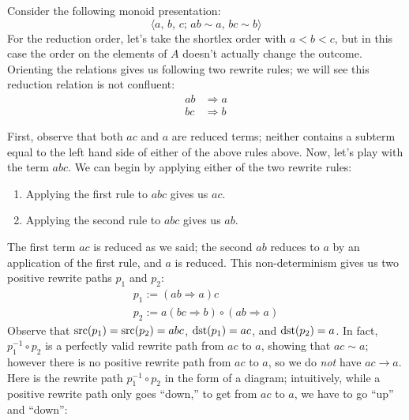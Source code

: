 \documentclass[../generics]{subfiles}
\begin{document}
\begin{example}\label{not confluent presentation}
Consider the following monoid presentation:
\[\langle a,\,b,\,c;\,ab\sim a,\,bc\sim b\rangle\]
For the reduction order, let's take the shortlex order with $a<b<c$, but in this case the order on the elements of $A$ doesn't actually change the outcome. Orienting the relations gives us following two rewrite rules; we will see this reduction relation is not confluent:
\begin{align*}
ab&\Rightarrow a\\
bc&\Rightarrow b
\end{align*}

%
First, observe that both $ac$ and $a$ are reduced terms; neither contains a subterm equal to the left hand side of either of the above rules above. Now, let's play with the term $abc$. We can begin by applying either of the two rewrite rules:
\begin{enumerate}
\item Applying the first rule to $abc$ gives us $ac$.
\item Applying the second rule to $abc$ gives us $ab$.
\end{enumerate}
The first term $ac$ is reduced as we said; the second $ab$ reduces to $a$ by an application of the first rule, and $a$ is reduced. This non-determinism gives us two positive rewrite paths $p_1$ and $p_2$:
\begin{gather*}
p_1 := (ab\Rightarrow a)c\\
p_2 := a(bc\Rightarrow b)\circ(ab\Rightarrow a)
\end{gather*}
%
Observe that $\operatorname{src}(p_1)=\operatorname{src}(p_2)=abc$, $\operatorname{dst}(p_1)=ac$, and $\operatorname{dst}(p_2)=a$. In fact, $p_1^{-1}\circ p_2$ is a perfectly valid rewrite path from $ac$ to $a$, showing that $ac\sim a$; however there is no positive rewrite path from $ac$ to $a$, so we do \emph{not} have $ac\rightarrow a$. Here is the rewrite path $p_1^{-1}\circ p_2$ in the form of a diagram; intuitively, while a positive rewrite path only goes ``down,'' to get from $ac$ to $a$, we have to go ``up'' and ``down'':
\begin{quote}
\end{quote}
\end{example}
\end{document}
